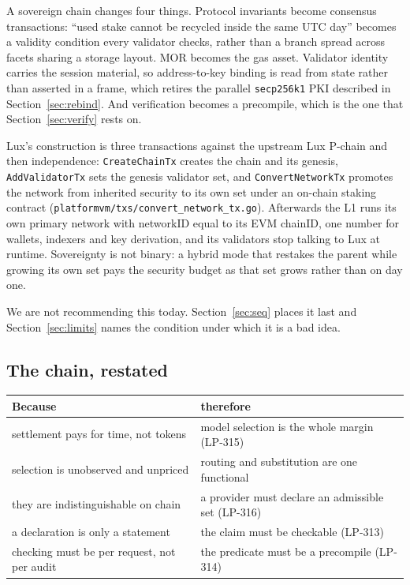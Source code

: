 \documentclass[11pt,a4paper]{article}
\newcommand{\code}[1]{\texttt{\small #1}}
\begin{document}
A sovereign chain changes four things. Protocol invariants become consensus
transactions: ``used stake cannot be recycled inside the same UTC day'' becomes
a validity condition every validator checks, rather than a branch spread across
facets sharing a storage layout. MOR becomes the gas asset. Validator identity
carries the session material, so address-to-key binding is read from state
rather than asserted in a frame, which retires the parallel \code{secp256k1} PKI
described in Section~\ref{sec:rebind}. And verification becomes a precompile,
which is the one that Section~\ref{sec:verify} rests on.

Lux's construction is three transactions against the upstream Lux P-chain and
then independence: \code{CreateChainTx} creates the chain and its genesis,
\code{AddValidatorTx} sets the genesis validator set, and
\code{ConvertNetworkTx} promotes the network from inherited security to its own
set under an on-chain staking contract
(\code{platformvm/txs/convert\_network\_tx.go}). Afterwards the L1 runs its own
primary network with networkID equal to its EVM chainID, one number for wallets,
indexers and key derivation, and its validators stop talking to Lux at runtime.
Sovereignty is not binary: a hybrid mode that restakes the parent while growing
its own set pays the security budget as that set grows rather than on day one.

We are not recommending this today. Section~\ref{sec:seq} places it last and
Section~\ref{sec:limits} names the condition under which it is a bad idea.

\subsection{The chain, restated}

\begin{center}
\begin{tabular}{@{}ll@{}}
\toprule
\textbf{Because} & \textbf{therefore} \\
\midrule
settlement pays for time, not tokens & model selection is the whole margin (LP-315) \\
selection is unobserved and unpriced & routing and substitution are one functional \\
they are indistinguishable on chain & a provider must declare an admissible set (LP-316) \\
a declaration is only a statement & the claim must be checkable (LP-313) \\
checking must be per request, not per audit & the predicate must be a precompile (LP-314) \\
\bottomrule
\end{tabular}
\end{center}
\end{document}
